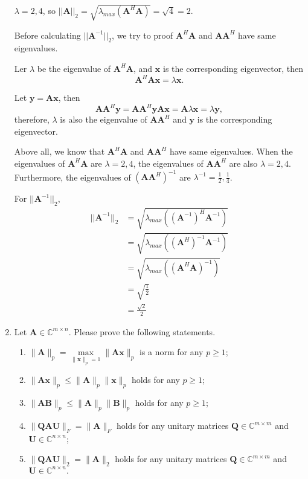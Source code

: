 \documentclass[12pt, a4paper, UTF8]{ctexart}
\begin{document}
\begin{enumerate}
		$\lambda =2, 4$, so $||\bm{A}||_2 = \sqrt{\lambda_{max}(\bm{A}^H \bm{A})}=\sqrt{4}=2$.

		Before calculating $||\bm{A}^{-1}||_2$, we try to proof $\bm{A}^H \bm{A}$ and $\bm{A} \bm{A}^H$ have same eigenvalues.

		Ler $\lambda$ be the eigenvalue of $\bm{A}^H\bm{A}$, and $\mathbf{x}$ is the corresponding eigenvector, then
		\begin{equation*}
			\bm{A}^H \bm{A} \bm{x} = \lambda \bm{x}.
		\end{equation*}

		Let $\bm{y} = \bm{A}\bm{x}$, then
		\begin{equation*}
			\bm{A}\bm{A}^H\bm{y} = \bm{A}\bm{A}^H\bm{y}\bm{A}\bm{x} = \bm{A}\lambda \bm{x} = \lambda\bm{y},
		\end{equation*}
		therefore, $\lambda$ is also the eigenvalue of $\bm{A}\bm{A}^H$ and $\bm{y}$ is the corresponding eigenvector.

		Above all, we know that $\bm{A}^H \bm{A}$ and $\bm{A} \bm{A}^H$ have same eigenvalues. When the eigenvalues of $\bm{A}^H \bm{A}$ are $\lambda =2, 4$, the eigenvalues of $\bm{A}\bm{A}^H$ are also $\lambda =2, 4$. Furthermore, the eigenvalues of $(\bm{A}\bm{A}^H)^{-1}$ are $\lambda^{-1} =\frac{1}{2}, \frac{1}{4}$.

		For $||\bm{A}^{-1}||_2$, 
		\begin{align*}
			||\bm{A}^{-1}||_2 &= \sqrt{\lambda_{max}((\bm{A}^{-1})^{H}\bm{A}^{-1})} \\
			&= \sqrt{\lambda_{max}((\bm{A}^{H})^{-1}\bm{A}^{-1})} \\
			&= \sqrt{\lambda_{max}((\bm{A}^{H}\bm{A})^{-1})} \\
			&= \sqrt{\frac{1}{2}} \\
			&=\frac{\sqrt{2}}{2}
		\end{align*}
		
		\item
		Let $\bm{A}\in\mathbb{C}^{m\times n}$. Please prove the following statements.
		\begin{enumerate}
			\item $\| \bm{A}\|_{p}=\max\limits_{\| \bm{x}\|_{p}=1}\| \bm{Ax}\|_{p}$ is a norm for any $p\geq 1$;
			\item $\| \bm{Ax}\|_{p}\leq\| \bm{A}\|_{p}\| \bm{x}\|_{p}$ holds for any $p\geq 1$;
			\item $\| \bm{AB}\|_{p}\leq\| \bm{A}\|_{p}\| \bm{B}\|_{p}$ holds for any $p\geq 1$;
			\item $\| \bm{QAU}\|_{F}=\| \bm{A}\|_{F}$ holds for any unitary matrices $\bm{Q}\in \mathbb{C}^{m\times m}$ and $\bm{U}\in \mathbb{C}^{n\times n}$;
			\item $\| \bm{QAU}\|_{2}=\| \bm{A}\|_{2}$ holds for any unitary matrices $\bm{Q}\in \mathbb{C}^{m\times m}$ and $\bm{U}\in \mathbb{C}^{n\times n}.$
		\end{enumerate}


\end{enumerate}
\end{document}
